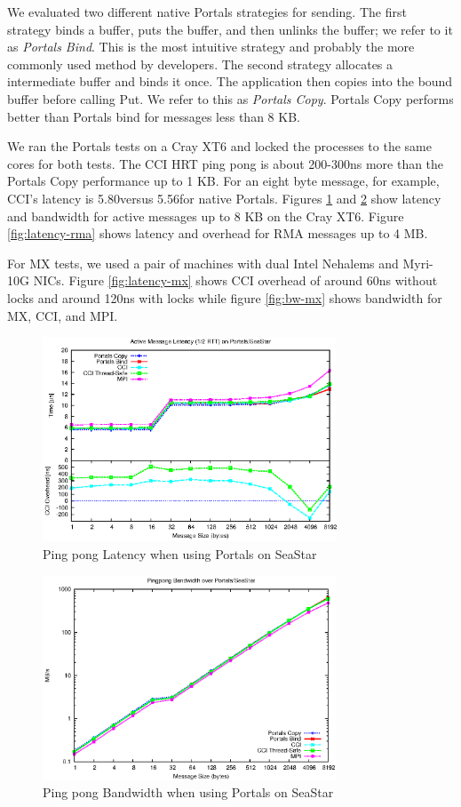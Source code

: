 We evaluated two different native Portals strategies for sending. The first strategy
binds a buffer, puts the buffer, and then unlinks the buffer; we refer to it as
\emph{Portals Bind}. This is the most intuitive strategy and probably the more
commonly used method by developers. The second strategy allocates a intermediate
buffer and binds it once. The application then copies into the bound buffer before
calling Put. We refer to this as \emph{Portals Copy}. Portals Copy performs better
than Portals bind for messages less than 8 KB.

We ran the Portals tests on a Cray XT6 and locked the processes to the same cores for
both tests. The CCI HRT ping pong is about 200-300ns more than the Portals Copy
performance up to 1 KB.  For an eight byte message, for example, CCI's latency is
5.80\us versus 5.56\us for native Portals.  Figures \ref{fig:latency-portals} and
\ref{fig:bw-portals} show latency and bandwidth for active messages up to 8 KB on the Cray
XT6. Figure \ref{fig:latency-rma} shows latency and overhead for RMA messages up to 4
MB.

For MX tests, we used a pair of machines with dual Intel Nehalems and Myri-10G NICs.
Figure \ref{fig:latency-mx} shows CCI overhead of around 60ns without locks and
around 120ns with locks while figure \ref{fig:bw-mx} shows bandwidth for MX, CCI, and
MPI.

\begin{figure}[htbp]
\centering
\includegraphics[width=3.45in]{pingpong-latency-portals-overhead-combined.eps}
\caption{Ping pong Latency when using Portals on SeaStar}
\label{fig:latency-portals}
\end{figure}

\begin{figure}[htbp]
\centering
\includegraphics[width=3.45in]{pingpong-bw-portals.eps}
\caption{Ping pong Bandwidth when using Portals on SeaStar}
\label{fig:bw-portals}
\end{figure}

